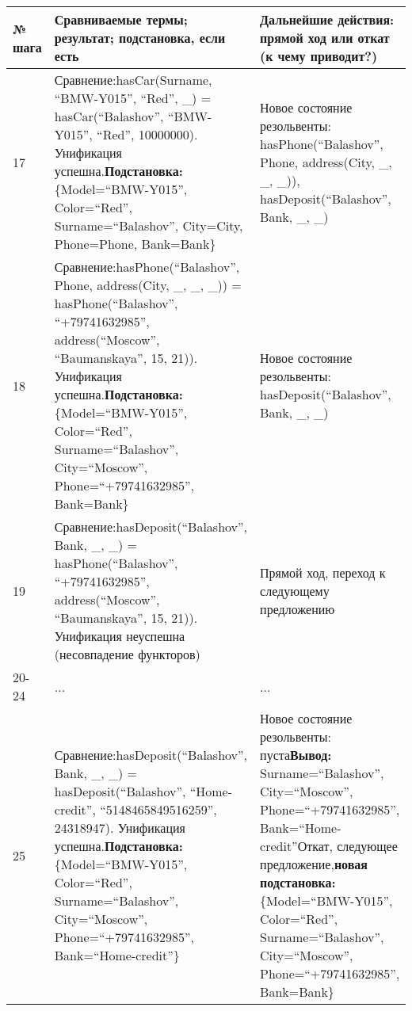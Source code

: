 \documentclass[14pt,a4paper]{scrreprt}
\begin{document}
\begin{enumerate}
\begin{table}[H]
	\centering
	\begin{tabular}{|p{1.2cm\small}|p{9cm\small}|p{5cm\small}|}
		\hline
		№ шага & Сравниваемые термы; результат; подстановка, если есть & Дальнейшие действия: прямой ход или откат (к чему приводит?)\\
		\hline
		17 & Сравнение:\linebreak hasCar(Surname, ``BMW-Y015'', ``Red'', \_) = hasCar(``Balashov'', ``BMW-Y015'', ``Red'', 10000000). Унификация успешна.\linebreak \textbf{Подстановка:} \{Model=``BMW-Y015'', Color=``Red'', Surname=``Balashov'', City=City, Phone=Phone, Bank=Bank\} & Новое состояние резольвенты: hasPhone(``Balashov'', Phone, address(City, \_, \_, \_)), hasDeposit(``Balashov'', Bank, \_, \_)\\
		\hline
		18 & Сравнение:\linebreak hasPhone(``Balashov'', Phone, address(City, \_, \_, \_)) = hasPhone(``Balashov'', ``+79741632985'', address(``Moscow'', ``Baumanskaya'', 15, 21)). Унификация успешна.\linebreak \textbf{Подстановка:} \{Model=``BMW-Y015'', Color=``Red'', Surname=``Balashov'', City=``Moscow'', Phone=``+79741632985'', Bank=Bank\} & Новое состояние резольвенты: hasDeposit(``Balashov'', Bank, \_, \_)\\
		\hline
		19 & Сравнение:\linebreak hasDeposit(``Balashov'', Bank, \_, \_) = hasPhone(``Balashov'', ``+79741632985'', address(``Moscow'', ``Baumanskaya'', 15, 21)). Унификация неуспешна (несовпадение функторов) & Прямой ход, переход к следующему предложению\\
		\hline
		20-24 & ... & ...\\
		\hline
		25 & Сравнение:\linebreak hasDeposit(``Balashov'', Bank, \_, \_) = hasDeposit(``Balashov'', ``Home-credit'', ``5148465849516259'', 24318947). Унификация успешна.\linebreak \textbf{Подстановка:} \{Model=``BMW-Y015'', Color=``Red'', Surname=``Balashov'', City=``Moscow'', Phone=``+79741632985'', Bank=``Home-credit''\} & Новое состояние резольвенты: пуста\linebreak \textbf{Вывод:} Surname=``Balashov'', City=``Moscow'', Phone=``+79741632985'', Bank=``Home-credit''\linebreak Откат, следующее предложение,\linebreak \textbf{новая подстановка:} \{Model=``BMW-Y015'', Color=``Red'', Surname=``Balashov'', City=``Moscow'', Phone=``+79741632985'', Bank=Bank\}\\
		\hline
	\end{tabular}
\end{table}


\end{enumerate}
\end{document}
